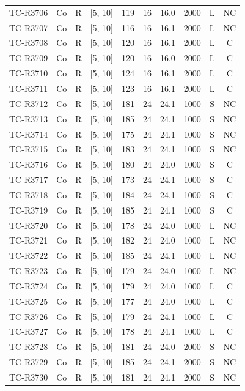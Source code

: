 \begin{longtable}{lccccccccc}
TC-R3706 & Co & R & [5, 10] & 119 & 16 & 16.0 & 2000 & L & NC \\
TC-R3707 & Co & R & [5, 10] & 116 & 16 & 16.1 & 2000 & L & NC \\
TC-R3708 & Co & R & [5, 10] & 120 & 16 & 16.1 & 2000 & L & C \\
TC-R3709 & Co & R & [5, 10] & 120 & 16 & 16.0 & 2000 & L & C \\
TC-R3710 & Co & R & [5, 10] & 124 & 16 & 16.1 & 2000 & L & C \\
TC-R3711 & Co & R & [5, 10] & 123 & 16 & 16.1 & 2000 & L & C \\
TC-R3712 & Co & R & [5, 10] & 181 & 24 & 24.1 & 1000 & S & NC \\
TC-R3713 & Co & R & [5, 10] & 185 & 24 & 24.1 & 1000 & S & NC \\
TC-R3714 & Co & R & [5, 10] & 175 & 24 & 24.1 & 1000 & S & NC \\
TC-R3715 & Co & R & [5, 10] & 183 & 24 & 24.1 & 1000 & S & NC \\
TC-R3716 & Co & R & [5, 10] & 180 & 24 & 24.0 & 1000 & S & C \\
TC-R3717 & Co & R & [5, 10] & 173 & 24 & 24.1 & 1000 & S & C \\
TC-R3718 & Co & R & [5, 10] & 184 & 24 & 24.1 & 1000 & S & C \\
TC-R3719 & Co & R & [5, 10] & 185 & 24 & 24.1 & 1000 & S & C \\
TC-R3720 & Co & R & [5, 10] & 178 & 24 & 24.0 & 1000 & L & NC \\
TC-R3721 & Co & R & [5, 10] & 182 & 24 & 24.0 & 1000 & L & NC \\
TC-R3722 & Co & R & [5, 10] & 185 & 24 & 24.1 & 1000 & L & NC \\
TC-R3723 & Co & R & [5, 10] & 179 & 24 & 24.0 & 1000 & L & NC \\
TC-R3724 & Co & R & [5, 10] & 179 & 24 & 24.0 & 1000 & L & C \\
TC-R3725 & Co & R & [5, 10] & 177 & 24 & 24.0 & 1000 & L & C \\
TC-R3726 & Co & R & [5, 10] & 179 & 24 & 24.1 & 1000 & L & C \\
TC-R3727 & Co & R & [5, 10] & 178 & 24 & 24.1 & 1000 & L & C \\
TC-R3728 & Co & R & [5, 10] & 181 & 24 & 24.0 & 2000 & S & NC \\
TC-R3729 & Co & R & [5, 10] & 185 & 24 & 24.1 & 2000 & S & NC \\
TC-R3730 & Co & R & [5, 10] & 181 & 24 & 24.1 & 2000 & S & NC \\

\end{longtable}
